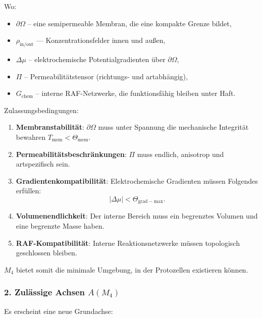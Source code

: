 Wo:

\begin{itemize}
    \item $\partial\Omega$ – eine semipermeable Membran, die eine kompakte Grenze bildet,
    \item $\rho_{\mathrm{in/out}}$ — Konzentrationsfelder innen und außen,
    \item $\Delta\mu$ – elektrochemische Potentialgradienten über $\partial\Omega$,
    \item $\Pi$ – Permeabilitätstensor (richtungs- und artabhängig),
    \item $G_{\mathrm{chem}}$ – interne RAF-Netzwerke, die funktionsfähig bleiben
          unter Haft.
\end{itemize}

Zulassungsbedingungen:

\begin{enumerate}
    \item \textbf{Membranstabilität}:
    $\partial\Omega$ muss unter Spannung die mechanische Integrität bewahren
    $T_{\mathrm{mem}} < \Theta_{\mathrm{mem}}$.

    \item \textbf{Permeabilitätsbeschränkungen}:
    $\Pi$ muss endlich, anisotrop und artspezifisch sein.

    \item \textbf{Gradientenkompatibilität}:
    Elektrochemische Gradienten müssen Folgendes erfüllen:
    \[
    |\Delta\mu| < \Theta_{\mathrm{grad-max}}.
    \]

    \item \textbf{Volumenendlichkeit}:
    Der interne Bereich muss ein begrenztes Volumen und eine begrenzte Masse haben.

    \item \textbf{RAF-Kompatibilität}:
    Interne Reaktionsnetzwerke müssen topologisch geschlossen bleiben.
\end{enumerate}

$M_4$ bietet somit die minimale Umgebung, in der Protozellen existieren können.

\subsubsection*{2. Zulässige Achsen \texorpdfstring{$A(M_4)$}{A(M_4)}}

Es erscheint eine neue Grundachse:

